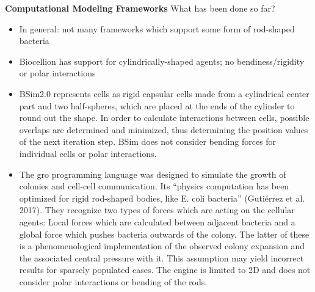 \documentclass{article}
\begin{document}
\textbf{Computational Modeling Frameworks}
What has been done so far?
\begin{itemize}
    \item In general: not many frameworks which support some form of rod-shaped bacteria
    \item \cite{Kang2014} Biocellion has support for cylindrically-shaped agents; no
        bendiness/rigidity or polar interactions
    \item \cite{Matyjaszkiewicz2017} BSim2.0 represents cells as rigid capsular cells made from a
        cylindrical center part and two half-spheres, which are placed at the ends of the cylinder
        to round out the shape. In order to calculate interactions between cells, possible overlaps
        are determined and minimized, thus determining the position values of the next iteration
        step.
        BSim does not consider bending forces for individual cells or polar interactions.
    \item \cite{Gutirrez2017} The gro programming language was designed to simulate the growth of
        colonies and cell-cell communication. Its “physics computation has been optimized for rigid
        rod-shaped bodies, like E. coli bacteria” (Gutiérrez et al. 2017). They recognize two types
        of forces which are acting on the cellular agents: Local forces which are calculated between
        adjacent bacteria and a global force which pushes bacteria outwards of the colony. The
        latter of these is a phenomenological implementation of the observed colony expansion and
        the associated central pressure with it. This assumption may yield incorrect results for
        sparsely populated cases.
        The engine is limited to 2D and does not consider polar interactions or bending of the rods.
\end{itemize}

\end{document}
